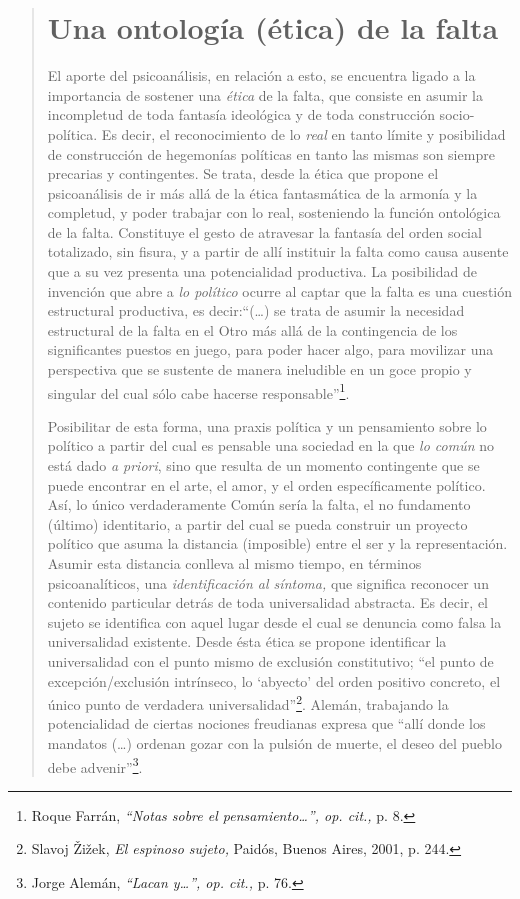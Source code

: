 \begin{quote}
\section{Una ontología (ética) de la falta}

El aporte del psicoanálisis, en relación a esto, se encuentra ligado a la importancia de sostener una \emph{ética} de la falta, que consiste en asumir la incompletud de toda fantasía ideológica y de toda construcción socio-política. Es decir, el reconocimiento de lo \emph{real} en tanto límite y posibilidad de construcción de hegemonías políticas en tanto las mismas son siempre precarias y contingentes. Se trata, desde la ética que propone el psicoanálisis de ir más allá de la ética fantasmática de la armonía y la completud, y poder trabajar con lo real, sosteniendo la función ontológica de la falta. Constituye el gesto de atravesar la fantasía del orden social totalizado, sin fisura, y a partir de allí instituir la falta como causa ausente que a su vez presenta una potencialidad productiva. La posibilidad de invención que abre a \emph{lo político} ocurre al captar que la falta es una cuestión estructural productiva, es decir:\enquote{(\dots) se trata de asumir la necesidad estructural de la falta en el Otro más allá de la contingencia de los significantes puestos en juego, para poder hacer algo, para movilizar una perspectiva que se sustente de manera ineludible en un goce propio y singular del cual sólo cabe hacerse responsable}\footnote{Roque Farrán, \emph{\enquote{Notas sobre el pensamiento\ldots}, op. cit.,} p. 8.}.

Posibilitar de esta forma, una praxis política y un pensamiento sobre lo político a partir del cual es pensable una sociedad en la que \emph{lo común} no está dado \emph{a priori}, sino que resulta de un momento contingente que se puede encontrar en el arte, el amor, y el orden específicamente político. Así, lo único verdaderamente Común sería la falta, el no fundamento (último) identitario, a partir del cual se pueda construir un proyecto político que asuma la distancia (imposible) entre el ser y la representación. Asumir esta distancia conlleva al mismo tiempo, en términos psicoanalíticos, una \emph{identificación al síntoma,} que significa reconocer un contenido particular detrás de toda universalidad abstracta. Es decir, el sujeto se identifica con aquel lugar desde el cual se denuncia como falsa la universalidad existente. Desde ésta ética se propone identificar la universalidad con el punto mismo de exclusión constitutivo; \enquote{el punto de excepción/exclusión intrínseco, lo \enquote{abyecto} del orden positivo concreto, el único punto de verdadera universalidad}\footnote{Slavoj Žižek, \emph{El espinoso sujeto,} Paidós, Buenos Aires, 2001, p. 244.}. Alemán, trabajando la potencialidad de ciertas nociones freudianas expresa que \enquote{allí donde los mandatos (\dots) ordenan gozar con la pulsión de muerte, el deseo del pueblo debe advenir}\footnote{Jorge Alemán, \emph{\enquote{Lacan y\ldots}, op. cit.,} p. 76.}.


\end{quote}
